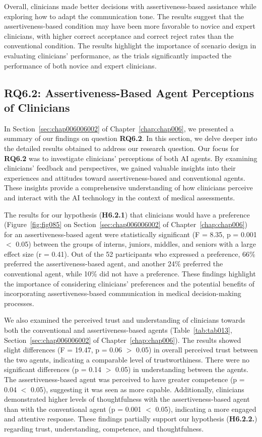 Overall, clinicians made better decisions with assertiveness-based assistance while exploring how to adapt the communication tone.
The results suggest that the assertiveness-based condition may have been more favorable to novice and expert clinicians, with higher correct acceptance and correct reject rates than the conventional condition.
The results highlight the importance of scenario design in evaluating clinicians' performance, as the trials significantly impacted the performance of both novice and expert clinicians.

\subsection{RQ6.2: Assertiveness-Based Agent Perceptions of Clinicians}
\label{sec:app005007002}

In Section~\ref{sec:chap006006002} of Chapter~\ref{chap:chap006}, we presented a summary of our findings on question {\bf RQ6.2}.
In this section, we delve deeper into the detailed results obtained to address our research question. Our focus for {\bf RQ6.2} was to investigate clinicians' perceptions of both \ac{AI} agents.
By examining clinicians' feedback and perspectives, we gained valuable insights into their experiences and attitudes toward assertiveness-based and conventional agents.
These insights provide a comprehensive understanding of how clinicians perceive and interact with the \ac{AI} technology in the context of medical assessments.

The results for our hypothesis ({\bf H6.2.1}) that clinicians would have a preference (Figure~\ref{fig:fig085} on Section~\ref{sec:chap006006002} of Chapter~\ref{chap:chap006}) for an assertiveness-based agent were statistically significant (F = 8.35, p = 0.001 $<$ 0.05) between the groups of interns, juniors, middles, and seniors with a large effect size (r = 0.41).
Out of the 52 participants who expressed a preference, 66\% preferred the assertiveness-based agent, and another 24\% preferred the conventional agent, while 10\% did not have a preference.
These findings highlight the importance of considering clinicians' preferences and the potential benefits of incorporating assertiveness-based communication in medical decision-making processes.

We also examined the perceived trust and understanding of clinicians towards both the conventional and assertiveness-based agents (Table~\ref{tab:tab013}, Section~\ref{sec:chap006006002} of Chapter~\ref{chap:chap006}).
The results showed slight differences (F = 19.47, p = 0.06 $>$ 0.05) in overall perceived trust between the two agents, indicating a comparable level of trustworthiness.
There were no significant differences (p = 0.14 $>$ 0.05) in understanding between the agents.
\textcolor{revised}{The assertiveness-based agent was perceived to have greater competence (p = 0.04 $<$ 0.05), suggesting it was seen as more capable.}
Additionally, clinicians demonstrated higher levels of thoughtfulness with the assertiveness-based agent than with the conventional agent (p = 0.001 $<$ 0.05), indicating a more engaged and attentive response.
These findings partially support our hypothesis ({\bf H6.2.2.}) regarding trust, understanding, competence, and thoughtfulness.

